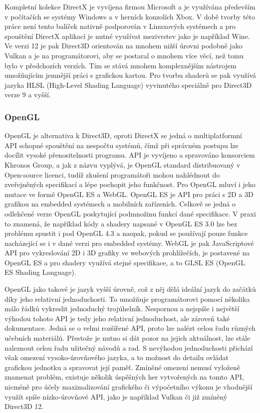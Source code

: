 Kompletní kolekce DirectX je vyvíjena firmou Microsoft a je využívána především v počítačích se systémy Windows a v herních konzolích Xbox. V době tvorby této práce není tento balíček nativně podporován v Linuxových systémech a pro spouštění DirectX aplikací je nutné využívat mezivrstev jako je například Wine. Ve verzi 12 je pak Direct3D orientován na mnohem nižší úrovni podobně jako Vulkan a je na programátorovi, aby se postaral o mnohem více věcí, než tomu bylo v předchozích verzích. Tím se stává mnohem komplexnějším nástrojem umožňujícím jemnější práci s grafickou kartou. Pro tvorbu shaderů se pak využívá jazyka HLSL (High-Level Shading Language) vyvinutého speciálně pro Direct3D verze 9 a vyšší. \cite{parrish_2016} \cite{grantmestrength}
\subsubsection{OpenGL}
OpenGL je alternativa k Direct3D, oproti DirectX se jedná o multiplatformní API schopné spouštění na nespočtu systémů, čímž při správném postupu lze docílit vysoké přenositelnosti programu. API je vyvíjeno a spravováno konsorciem Khronos Group, a jak z názvu vyplývá, je OpenGL standard distribuovaný v Open-source licenci, tudíž zkušení programátoři mohou nahlédnout do zveřejněných specifikací a lépe pochopit jeho funkčnost. Pro OpenGL mluví i jeho mutace ve formě OpenGL ES a WebGL. OpenGL ES je API pro práci s 2D a 3D grafikou na embedded systémech a mobilních zařízeních. Celkově se jedná o odlehčené verze OpenGL poskytující podmnožinu funkcí dané specifikace. V praxi to znamená, že například kódy a shadery napsané v OpenGL ES 3.0 lze bez problému spustit i pod OpenGL 4.3 a naopak, pokud se používají pouze funkce nacházející se i v dané verzi pro embedded systémy. WebGL je pak JavaScriptové API pro vykreslování 2D i 3D grafiky ve webových prohlížečích, je postavené na OpenGL ES a pro shadery využívá stejné specifikace, a to GLSL ES (OpenGL ES Shading Language). \cite{opengl} \cite{webgl} \cite{group}

OpenGL jako takové je jazyk vyšší úrovně, což z něj dělá ideální jazyk do začátků díky jeho relativní jednoduchosti. To umožňuje programátorovi pomocí několika málo řádků vykreslit jednoduchý trojúhelník. Nespornou a nejspíše i největší výhodou tohoto API je tedy jeho relativní jednoduchost, ale zároveň také dokumentace. Jedná se o velmi rozšířené API, proto lze nalézt celou řadu různých učebních materiálů. Přestože je nutno si dát pozor na jejich aktuálnost, lze stále naleznout celou řadu užitečný návodů a rad. S nevýhodou jednoduchosti přichází však omezení vysoko-úrovňového jazyka, a to možnost do detailu ovládat grafickou jednotku a spravovat její paměť. Zmíněné omezení nemusí vyloženě znamenat problém, existuje několik úspěšných her vytvořených na tomto API, nicméně pro účely maximalizování grafického či výpočetního výkonu je vhodnější využít spíše nízko-úrovňové API, jako je například Vulkan či již zmíněný Direct3D 12.


